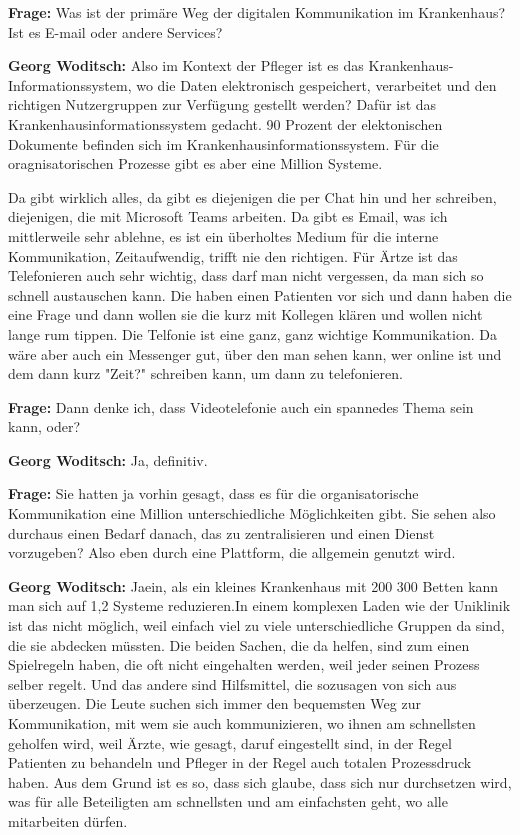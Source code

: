 \textbf{Frage: }  Was ist der primäre Weg der digitalen Kommunikation im Krankenhaus? Ist es E-mail oder andere Services?

\textbf{Georg Woditsch: } Also im Kontext der Pfleger ist es das Krankenhaus-Informationssystem, wo die Daten elektronisch gespeichert, verarbeitet und den richtigen Nutzergruppen zur Verfügung gestellt werden? Dafür ist das Krankenhausinformationssystem gedacht. 90 Prozent der elektonischen Dokumente befinden sich im Krankenhausinformationssystem. Für die oragnisatorischen Prozesse gibt es aber eine Million Systeme.

Da gibt wirklich alles, da gibt es diejenigen die per Chat hin und her schreiben, diejenigen, die mit Microsoft Teams arbeiten. Da gibt es Email, was ich mittlerweile sehr ablehne, es ist ein überholtes Medium für die interne Kommunikation, Zeitaufwendig, trifft nie den richtigen. Für Ärtze ist das Telefonieren auch sehr wichtig, dass darf man nicht vergessen, da man sich so schnell austauschen kann. Die haben einen Patienten vor sich und dann haben die eine Frage und dann wollen sie die kurz mit Kollegen klären und wollen nicht lange rum tippen. Die Telfonie ist eine ganz, ganz wichtige Kommunikation. Da wäre aber auch ein Messenger gut, über den man sehen kann, wer online ist und dem dann kurz "Zeit?" schreiben kann, um dann zu telefonieren.

\textbf{Frage: } Dann denke ich, dass Videotelefonie auch ein spannedes Thema sein kann, oder?

\textbf{Georg Woditsch: } Ja, definitiv.

\textbf{Frage: } Sie hatten ja vorhin gesagt, dass es für die organisatorische Kommunikation eine Million unterschiedliche Möglichkeiten gibt. Sie sehen also durchaus einen Bedarf danach, das zu zentralisieren und einen Dienst vorzugeben? Also eben durch eine Plattform, die allgemein genutzt wird.

\textbf{Georg Woditsch: } Jaein, als ein kleines Krankenhaus mit 200 300 Betten kann man sich auf 1,2 Systeme reduzieren.In einem komplexen Laden wie der Uniklinik ist das nicht möglich, weil einfach viel zu viele unterschiedliche Gruppen da sind, die sie abdecken müssten. Die beiden Sachen, die da helfen, sind zum einen Spielregeln haben, die oft nicht eingehalten werden, weil jeder seinen Prozess selber regelt. Und das andere sind Hilfsmittel, die sozusagen von sich aus überzeugen. Die Leute suchen sich immer den bequemsten Weg zur Kommunikation, mit wem sie auch kommunizieren, wo ihnen am schnellsten geholfen wird, weil Ärzte, wie gesagt, daruf eingestellt sind, in der Regel Patienten zu behandeln und Pfleger in der Regel auch totalen Prozessdruck haben. Aus dem Grund ist es so, dass sich glaube, dass sich nur durchsetzen wird, was für alle Beteiligten am schnellsten und am einfachsten geht, wo alle mitarbeiten dürfen.

